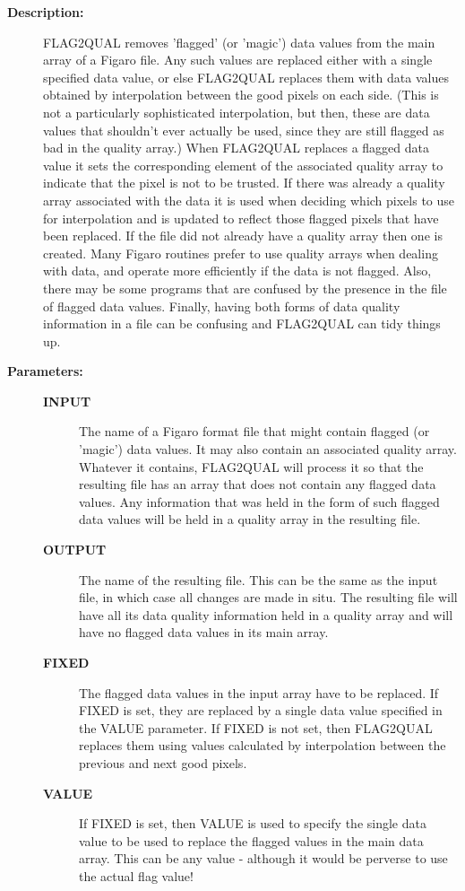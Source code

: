 \begin{description}
\begin{description}
\item [\textbf{Description:}]
 FLAG2QUAL removes 'flagged' (or 'magic') data values from the main
 array of a Figaro file. Any such values are replaced either with a
 single specified data value, or else FLAG2QUAL replaces them with
 data values obtained by interpolation between the good pixels on
 each side. (This is not a particularly sophisticated interpolation,
 but then, these are data values that shouldn't ever actually be
 used, since they are still flagged as bad in the quality array.)
 When FLAG2QUAL replaces a flagged data value it sets the
 corresponding element of the associated quality array to indicate
 that the pixel is not to be trusted. If there was already a quality
 array associated with the data it is used when deciding which pixels
 to use for interpolation and is updated to reflect those flagged
 pixels that have been replaced.  If the file did not already have a
 quality array then one is created. Many Figaro routines prefer to
 use quality arrays when dealing with data, and operate more
 efficiently if the data is not flagged. Also, there may be some
 programs that are confused by the presence in the file of flagged
 data values. Finally, having both forms of data quality information
 in a file can be confusing and FLAG2QUAL can tidy things up.

\item [\textbf{Parameters:}]
\begin{description}
\item [\textbf{INPUT}]
 The name of a Figaro format file that might contain
 flagged (or 'magic') data values.  It may also
 contain an associated quality array. Whatever it
 contains, FLAG2QUAL will process it so that the resulting
 file has an array that does not contain any flagged data
 values. Any information that was held in the form of
 such flagged data values will be held in a quality array
 in the resulting file.
\item [\textbf{OUTPUT}]
 The name of the resulting file. This can
 be the same as the input file, in which case all changes are
 made in situ. The resulting file will have all its data
 quality information held in a quality array and will have no
 flagged data values in its main array.
\item [\textbf{FIXED}]
 The flagged data values in the input array have to be replaced.
 If FIXED is set, they are replaced by a single data value
 specified in the VALUE parameter. If FIXED is not set, then
 FLAG2QUAL replaces them using values calculated by
 interpolation between the previous and next good pixels.
\item [\textbf{VALUE}]
 If FIXED is set, then VALUE is used to specify the single data
 value to be used to replace the flagged values in the main data
 array. This can be any value - although it would be perverse to
 use the actual flag value!
\end{description}


\end{description}
\end{description}
